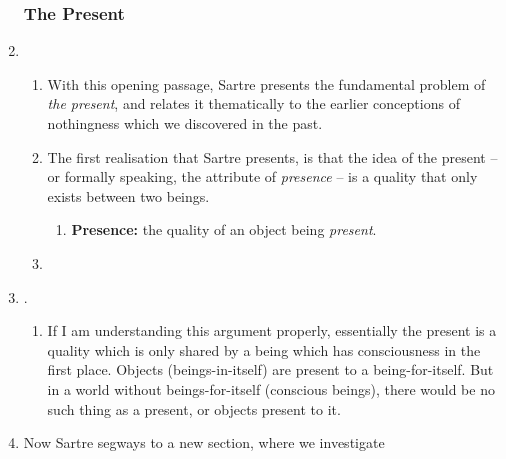 \begin{enumerate}
  \subsubsection*{The Present}
  \item {}
  \begin{enumerate}
    \item With this opening passage, Sartre presents the fundamental problem of \emph{the present}, and relates it thematically to the earlier conceptions of nothingness which we discovered in the past.
    \item The first realisation that Sartre presents, is that the idea of the present -- or formally speaking, the attribute of \emph{presence} -- is a quality that only exists between two beings.
    \begin{enumerate}
      \item \textbf{Presence:} the quality of an object being \emph{present}.
    \end{enumerate}
    \item {}
  \end{enumerate}
  \item {}.
  \begin{enumerate}
    \item If I am understanding this argument properly, essentially the present is a quality which is only shared by a being which has consciousness in the first place. Objects (beings-in-itself) are present to a being-for-itself. But in a world without beings-for-itself (conscious beings), there would be no such thing as a present, or objects present to it.
  \end{enumerate}
  \item Now Sartre segways to a new section, where we investigate 

\end{enumerate}
